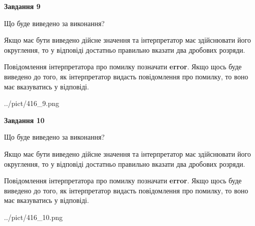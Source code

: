 \documentclass[12pt, ukrainian]{article}
\begin{document}
{\begin {Large}
{\begin {center}\textbf{Завдання 9}\end {center}}\par
Що буде виведено за виконання? \par

Якщо має бути виведено дійсне значення та інтерпретатор має здійснювати його округлення, 
то у відповіді достатньо правильно вказати два дробових розряди.

Повідомлення інтерпретатора про помилку позначати \textbf{error}.
Якщо щось буде виведено до того, як інтерпретатор видасть повідомлення про помилку, 
то воно має вказуватись у відповіді. \par

\begin{center}
	{../pict/416_9.png}
\end{center}
\newpage

{\begin {center}\textbf{Завдання 10}\end {center}}\par
Що буде виведено за виконання? \par

Якщо має бути виведено дійсне значення та інтерпретатор має здійснювати його округлення, 
то у відповіді достатньо правильно вказати два дробових розряди.

Повідомлення інтерпретатора про помилку позначати \textbf{error}.
Якщо щось буде виведено до того, як інтерпретатор видасть повідомлення про помилку, 
то воно має вказуватись у відповіді. \par

\begin{center}
	{../pict/416_10.png}
\end{center}
\newpage

\end {Large}}
\end{document}
